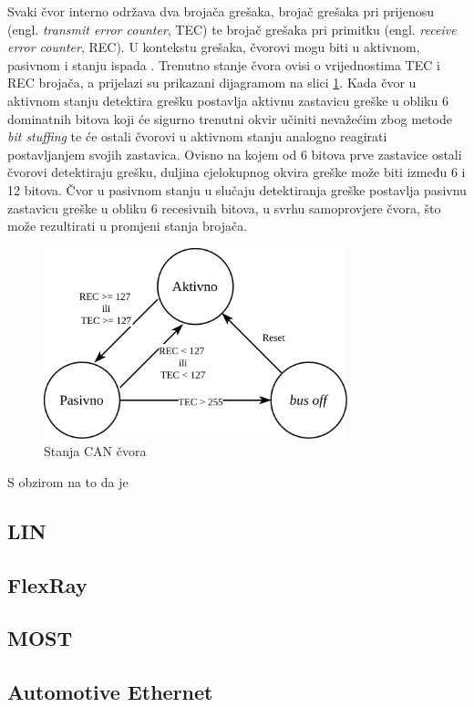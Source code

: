\documentclass[times, utf8, diplomski, numeric]{fer}
\begin{document}
Svaki čvor interno održava dva brojača grešaka, brojač grešaka pri prijenosu (engl. \textit{transmit error counter}, TEC) te brojač grešaka pri primitku (engl. \textit{receive error counter}, REC). U kontekstu grešaka, čvorovi mogu biti u aktivnom, pasivnom i stanju ispada . Trenutno stanje čvora ovisi o vrijednostima TEC i REC brojača, a prijelazi su prikazani dijagramom na slici \ref{fig:error_stanja}. Kada čvor u aktivnom stanju detektira grešku postavlja aktivnu zastavicu greške u obliku 6 dominatnih bitova koji će sigurno trenutni okvir učiniti nevažećim zbog metode \textit{bit stuffing} te će ostali čvorovi u aktivnom stanju analogno reagirati postavljanjem svojih zastavica. Ovisno na kojem od 6 bitova prve zastavice ostali čvorovi detektiraju grešku, duljina cjelokupnog okvira greške može biti između 6 i 12 bitova. Čvor u pasivnom stanju u slučaju detektiranja greške postavlja pasivnu zastavicu greške u obliku 6 recesivnih bitova, u svrhu samoprovjere čvora, što može rezultirati u promjeni stanja brojača. 
\begin{figure}[htb]
\centering
\includegraphics[width=250pt]{slike/stanja.png}
\caption{Stanja CAN čvora}
\label{fig:error_stanja}
\end{figure}

S obzirom na to da je 






\subsection{LIN}
\subsection{FlexRay}
\subsection{MOST}
\subsection{Automotive Ethernet}
\end{document}
